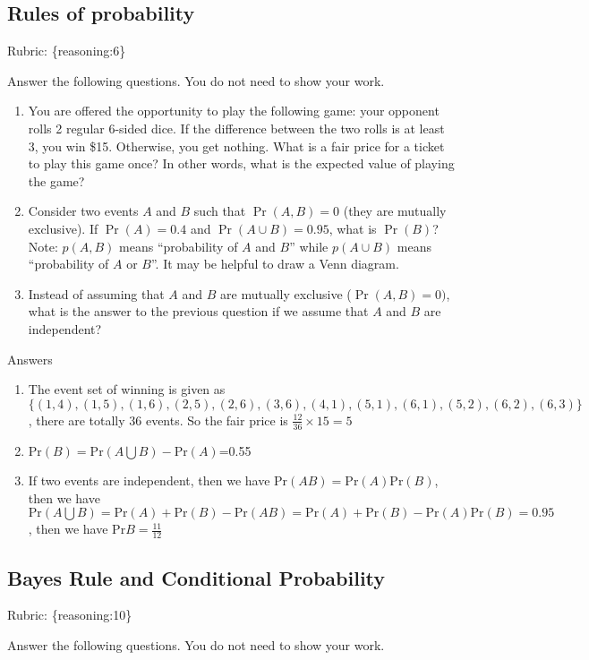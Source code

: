 \documentclass{article}
\def\rubric#1{\gre{Rubric: \{#1\}}}{}
\def\blu#1{{\color{blu}#1}}
\def\gre#1{{\color{gre}#1}}
\def\red#1{{\color{red}#1}}
\begin{document}
\subsection{Rules of probability}
\rubric{reasoning:6}

\blu{Answer the following questions.} You do not need to show your work.


\begin{enumerate}
\item You are offered the opportunity to play the following game: your opponent rolls 2 regular 6-sided dice. If the difference between the two rolls is at least 3, you win \$15. Otherwise, you get nothing. What is a fair price for a ticket to play this game once? In other words, what is the expected value of playing the game?
\item Consider two events $A$ and $B$ such that $\Pr(A, B)=0$ (they are mutually exclusive). If $\Pr(A) = 0.4$ and $\Pr(A \cup B) = 0.95$, what is $\Pr(B)$? Note: $p(A, B)$ means
``probability of $A$ and $B$'' while $p(A \cup B)$ means ``probability of $A$ or $B$''. It may be helpful to draw a Venn diagram.
\item Instead of assuming that $A$ and $B$ are mutually exclusive ($\Pr(A,B) = 0)$, what is the answer to the previous question if we assume that $A$ and $B$ are independent?

\end{enumerate}
\red{Answers
\begin{enumerate}
\item The event set of winning is given as $\{(1,4), (1,5), (1,6), (2,5), (2,6), (3,6), (4,1),(5,1),(6,1),(5,2),(6,2),(6,3)\}$, there are totally $36$ events. So the fair price is $\frac{12}{36}\times 15 =5$
\item $\text{Pr}(B)=\text{Pr}(A\bigcup B)-\text{Pr}(A)$=0.55
\item If two events are independent, then we have $\text{Pr}(AB)=\text{Pr}(A)\text{Pr}(B)$, then we have $\text{Pr}(A\bigcup B) = \text{Pr}(A)+\text{Pr}(B)-\text{Pr}(AB)=\text{Pr}(A)+\text{Pr}(B)-\text{Pr}(A)\text{Pr}(B)=0.95$, then we have $\text{Pr}B=\frac{11}{12}$
\end{enumerate}}
\subsection{Bayes Rule and Conditional Probability}
\rubric{reasoning:10}

\blu{Answer the following questions.} You do not need to show your work.
\end{document}
